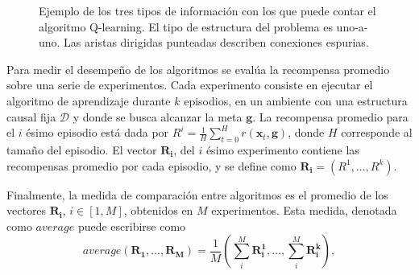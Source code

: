 \begin{figure}
  \centering
  \qquad
    \qquad
  \caption{Ejemplo de los tres tipos de información con los que puede  contar el algoritmo Q-learning. El tipo de estructura
  del problema es uno-a-uno. Las aristas dirigidas punteadas describen conexiones espurias.}
  \label{fig:types-info-dag}
\end{figure}

Para medir el desempeño de los algoritmos se evalúa la recompensa
promedio sobre una serie de experimentos.
Cada experimento consiste en ejecutar el algoritmo de aprendizaje durante $k$ episodios, en 
un ambiente con una estructura causal fija $\mathcal{D}$ y donde se busca alcanzar la meta $\mathbf{g}$.
La recompensa promedio para el $i$ ésimo episodio está dada por
$R^{i} = \frac{1}{H}\sum_{t=0}^H r(\mathbf{x}_t, \mathbf{g})$,
donde $H$ corresponde al tamaño del episodio.
El vector $\mathbf{R_i}$, del $i$ ésimo experimento contiene las recompensas promedio por cada episodio, y se define como
$\mathbf{R_i} = (R^{1}, \dots, R^k)$.

Finalmente, la medida de comparación entre algoritmos es
el promedio de los vectores $\mathbf{R_i}$, $i\in [1, M]$,  obtenidos en $M$ experimentos. Esta medida, denotada como  $average$ puede escribirse como 
\begin{equation}
\label{eq:average}
average(\mathbf{R_1}, \dots, \mathbf{R_M}) = \frac{1}{M}(\sum^M_i \mathbf{R_{i}^1}, \dots, \sum^M_i\mathbf{R_{i}^k}),    
\end{equation}

